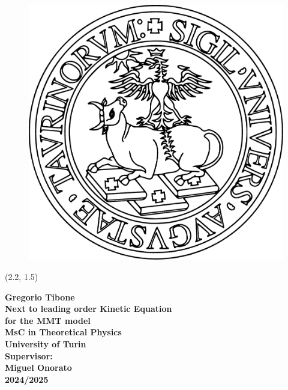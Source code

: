 \begin{titlepage}
    \thispagestyle{empty}
    \begin{figure}[!htb]
        \raggedleft
        \vspace{2cm}
        \hspace{1cm}
        \includegraphics[width=2\textwidth]{images/Unito-logo.pdf}  
    \end{figure}
    
    \begin{textblock}{15}(2.2, 1.5)  %
        \raggedright
        \large \bfseries Gregorio Tibone \\
        \Huge Next to leading order Kinetic Equation\\ for the MMT model \\[1cm] %
        \Large MsC in Theoretical Physics \\
        \Large University of Turin \\[1cm]  
        \large Supervisor: \\
        \large Miguel Onorato \\[1cm]
        \normalsize 2024/2025  \\
    \end{textblock}
\end{titlepage}
